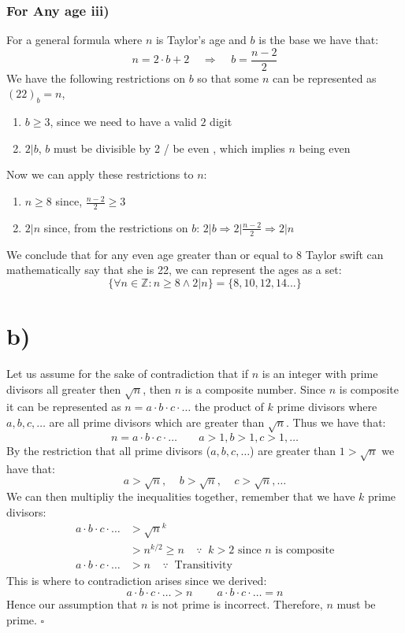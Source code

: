 \documentclass{article}
\begin{document}
\subsubsection*{For Any age\;\; iii)}
For a general formula where $n$ is Taylor's age and $b$ is the base we have that: 
$$n=2\cdot b+2\;\;\;\;\Rightarrow\;\;\;\;b=\frac{n-2}{2}$$
We have the following restrictions on $b$ so that some $n$ can be represented as $(22)_{b}=n$, 
\begin{enumerate}[i]
  \item $b\geq 3$, since we need to have a valid $2$ digit 
  \item $2|b$, $b$ must be divisible by 2 / be even , which implies $n$ being even 
\end{enumerate}
Now we can apply these restrictions to $n$:
\begin{enumerate}[i]
  \item $n\geq 8$ since, $\frac{n-2}{2}\geq 3$
  \item $2|n$ since, from the restrictions on $b$: $2|b\Rightarrow 2|\frac{n-2}{2} \Rightarrow 2|n$ 
\end{enumerate}
We conclude that for any even age greater than or equal to 8 Taylor swift can mathematically say that she is 22, we can represent the ages as a set: 
$$\{\forall n \in \mathbb{Z}: n\geq 8 \land 2|n\}=\{8,10,12,14...\}$$ 
\section*{b)}
Let us assume for the sake of contradiction that if $n$ is an integer with prime divisors all greater then $\sqrt{n}$, then $n$ is a composite number.
Since $n$ is composite it can be represented as $n= a \cdot  b \cdot c \cdot \dots$ the product of $k$ prime divisors where $a,b,c,\dots$ are all prime divisors which are greater than $\sqrt{n}$.
Thus we have that: $$n= a \cdot  b \cdot c \cdot \dots\;\;\;\;\;\;\;a>1,b>1,c>1,\dots$$
By the restriction that all prime divisors ($a,b,c,\dots$) are greater than $1>\sqrt{n}$ we have that:
$$a>\sqrt{n},\;\;\;\;b>\sqrt{n},\;\;\;\;c>\sqrt{n},\dots$$
We can then multipliy the inequalities together, remember that we have $k$ prime divisors:
$$\begin{aligned}
    a \cdot  b \cdot c \cdot \dots &> \sqrt{n}^k\\ 
                                   &> n^{k/2}\geq n \;\;\;\;\because\;\; k>2 \text{ since } n \text{ is composite}\\  
    a \cdot  b \cdot c \cdot \dots &> n \;\;\;\;\because\;\; \text{Transitivity}
\end{aligned}$$
This is where to contradiction arises since we derived: $$ a \cdot  b \cdot c \cdot \dots > n\;\;\;\;\;\;\;\;a \cdot  b \cdot c \cdot \dots = n$$
Hence our assumption that $n$ is not prime is incorrect. Therefore, $n$ must be prime. $\square$
\end{document}
